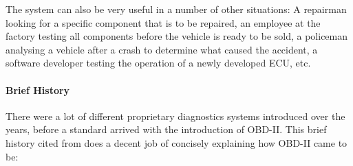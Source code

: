 \documentclass[11pt]{article}
\begin{document}
The system can also be very useful in a number of other situations: A repairman looking for a specific component that is to be repaired, an employee at the factory testing all components before the vehicle is ready to be sold, a policeman analysing a vehicle after a crash to determine what caused the accident, a software developer testing the operation of a newly developed ECU, etc. 
\newline

\paragraph{Brief History} 

There were a lot of different proprietary diagnostics systems introduced over the years, before a standard arrived with the introduction of OBD-II. This brief history cited from \cite{OBDhistory} does a decent job of concisely explaining how OBD-II came to be:
\end{document}
